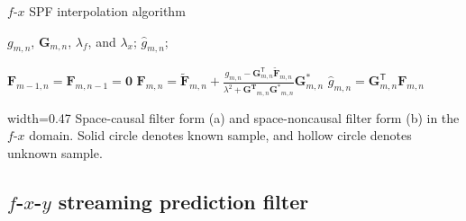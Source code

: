 \renewcommand{\algorithmicrequire}{\textbf{Input:}}
\renewcommand{\algorithmicensure}{\textbf{Output:}}
\begin{algorithm}
    \caption{$f$-$x$ SPF interpolation algorithm}
    \label{alg:fxinterp}
    \begin{algorithmic}[1]
        \REQUIRE
        $g_{m,n}$, $\mathbf{G}_{m,n}$, $\lambda_{f}$, and $\lambda_{x}$;
        \ENSURE
        $\hat{g}_{m,n}$;

        \STATE $ \mathbf{F}_{m-1,n} = \mathbf{F}_{m,n-1} = \mathbf{0} $
        \STATE $ \mathbf{F}_{m,n} = \mathbf{\tilde{F}}_{m,n} +
            \frac{ g_{m,n} - \mathbf{G}_{m,n}^{\mathsf{T}} \mathbf{\tilde{F}}_{m,n} }
            { \lambda^{2} + \mathbf{G^{T}}_{m,n} \mathbf{G^{*}}_{m,n} }
            \mathbf{G}_{m,n}^{*} $
        \STATE $ \hat{g}_{m,n} = \mathbf{G}_{m,n}^{\mathsf{T}} \mathbf{F}_{m,n} $
        \ENDIF
        \ENDFOR
        \ENDFOR
    \end{algorithmic}
\end{algorithm}

{width=0.47\columnwidth}
{Space-causal filter form (a) and space-noncausal filter form (b)
    in the $f$-$x$ domain. Solid circle denotes known sample,
    and hollow circle denotes unknown sample.}

\subsection{$f$-$x$-$y$ streaming prediction filter}

